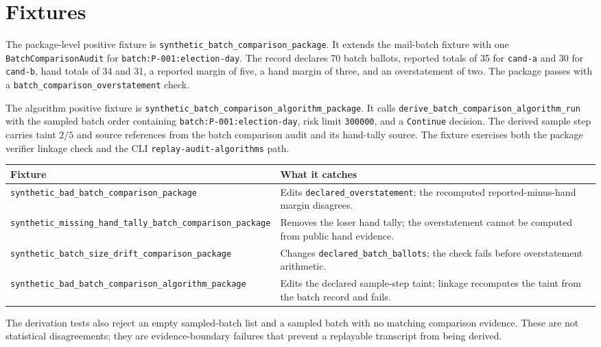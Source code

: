 \section{Fixtures}

The package-level positive fixture is
\texttt{synthetic\_batch\_comparison\_package}. It extends the mail-batch
fixture with one \texttt{BatchComparisonAudit} for
\texttt{batch:P-001:election-day}. The record declares 70 batch ballots,
reported totals of 35 for \texttt{cand-a} and 30 for \texttt{cand-b}, hand
totals of 34 and 31, a reported margin of five, a hand margin of three, and an
overstatement of two. The package passes with a
\texttt{batch\_comparison\_overstatement} check.

The algorithm positive fixture is
\texttt{synthetic\_batch\_comparison\_algorithm\_package}. It calls
\texttt{derive\_batch\_comparison\_algorithm\_run} with the sampled batch order
containing \texttt{batch:P-001:election-day}, risk limit \texttt{300000}, and a
\texttt{Continue} decision. The derived sample step carries taint $2/5$ and
source references from the batch comparison audit and its hand-tally source. The
fixture exercises both the package verifier linkage check and the CLI
\texttt{replay-audit-algorithms} path.

\begin{center}
\small
\begin{tabularx}{\textwidth}{lX}
\toprule
Fixture & What it catches \\
\midrule
\texttt{synthetic\_bad\_batch\_comparison\_package} & Edits \texttt{declared\_overstatement}; the recomputed reported-minus-hand margin disagrees. \\
\texttt{synthetic\_missing\_hand\_tally\_batch\_comparison\_package} & Removes the loser hand tally; the overstatement cannot be computed from public hand evidence. \\
\texttt{synthetic\_batch\_size\_drift\_comparison\_package} & Changes \texttt{declared\_batch\_ballots}; the check fails before overstatement arithmetic. \\
\texttt{synthetic\_bad\_batch\_comparison\_algorithm\_package} & Edits the declared sample-step taint; linkage recomputes the taint from the batch record and fails. \\
\bottomrule
\end{tabularx}
\end{center}

The derivation tests also reject an empty sampled-batch list and a sampled batch
with no matching comparison evidence. These are not statistical disagreements;
they are evidence-boundary failures that prevent a replayable transcript from
being derived.
